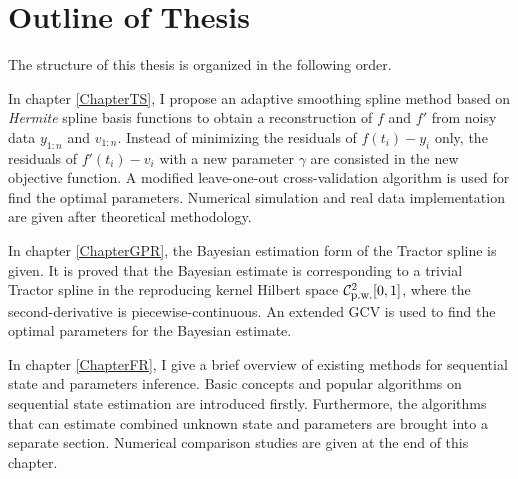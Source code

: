 %
%




\section{Outline of Thesis}

The structure of this thesis is organized in the following order. 

In chapter \ref{ChapterTS}, I propose an adaptive smoothing spline method based on \textit{Hermite} spline basis functions to obtain a reconstruction of $f$ and $f'$ from noisy data $y_{1:n}$ and $v_{1:n}$. Instead of minimizing the residuals of $f(t_i)-y_i$ only, the residuals of $f'(t_i)-v_i$ with a new parameter $\gamma$ are consisted in the new objective function. A modified leave-one-out cross-validation algorithm is used for find the optimal parameters. Numerical simulation and real data implementation are given after theoretical methodology. 

In chapter \ref{ChapterGPR}, the Bayesian estimation form of the Tractor spline is given. It is proved that the Bayesian estimate is corresponding to a trivial Tractor spline  in the reproducing kernel Hilbert space $\mathcal{C}_{\mbox{\footnotesize p.w.}}^2[0,1]$, where the second-derivative is piecewise-continuous.  An extended GCV is used to find the optimal parameters for the Bayesian estimate. 

In chapter \ref{ChapterFR}, I give a brief overview of existing methods for sequential state and parameters inference. Basic concepts and popular algorithms on sequential state estimation are introduced firstly. Furthermore, the algorithms that can estimate combined unknown state and parameters are brought into a separate section. Numerical comparison studies are given at the end of this chapter. 

